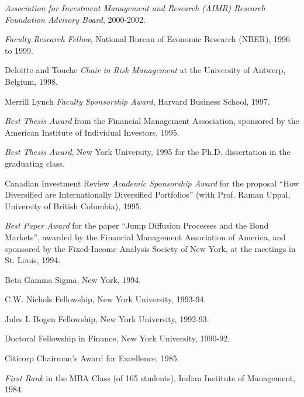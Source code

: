 \documentclass{article}
\begin{document}
\begin{description}
\begin{etaremune}
\item {\it Association for Investment Management and Research (AIMR)
 Research Foundation Advisory Board}, 2000-2002.

\item {\it Faculty Research Fellow}, National Bureau of Economic
Research (NBER), 1996 to 1999.

\item Deloitte and Touche {\it Chair in Risk Management} at the
University of Antwerp, Belgium, 1998.

\item Merrill Lynch {\it Faculty Sponsorship Award}, Harvard Business
School, 1997.

\item {\it Best Thesis Award} from the Financial Management Association,
sponsored by the American Institute
of Individual Investors, 1995. 

\item {\it Best Thesis Award}, New York University, 1995 for the Ph.D.
dissertation in the graduating class. 

\item Canadian Investment Review {\it Academic Sponsorship Award} for
the proposal ``How Diversified are Internationally Diversified
Portfolios'' (with Prof. Raman Uppal, University of British Columbia), 1995. 

\item {\it Best Paper Award} for the paper ``Jump Diffusion Processes
and the Bond Markets'', awarded by the Financial Management Association
of America, and sponsored by the Fixed-Income Analysis Society of New
York, at the meetings in St. Louis, 1994. 

\item Beta Gamma Sigma, New York, 1994. 

\item C.W. Nichols Fellowship, New York University, 1993-94. 

\item Jules I. Bogen Fellowship, New York University, 1992-93. 

\item Doctoral Fellowship in Finance, New York University, 1990-92. 

\item Citicorp Chairman's Award for Excellence, 1985. 

\item {\it First Rank} in the MBA Class (of 165 students),
Indian Institute of Management, 1984. 


\end{etaremune}
\end{description}
\end{document}
